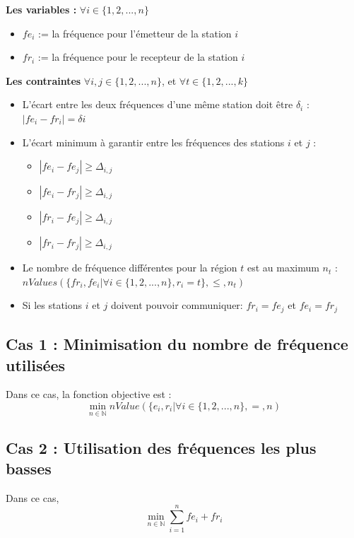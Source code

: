 \documentclass[a4paper, 10pt]{article}
\begin{document}
    \textbf{Les variables : } $\forall i \in \{1,2,...,n \}$
    \begin{itemize}
      \item $fe_{i}$ := la fréquence pour l'émetteur de la station $i$
      \item $fr_{i}$ := la fréquence pour le recepteur de la station $i$
    \end{itemize}

    \textbf{Les contraintes} $\forall i,j \in \{1,2,...,n \}$, et $\forall t \in \{1,2,...,k\}$
    \begin{itemize}
      \item L'écart entre les deux fréquences d'une même station doit être $\delta_{i}$ :
       $| fe_{i} - fr_{i} | = \delta{i}$
      \item L'écart minimum à garantir entre les fréquences des stations $i$ et $j$ :
      \begin{itemize}
        \item $| fe_i - fe_j | \geq \Delta_{i,j}$
        \item $| fe_i - fr_j | \geq \Delta_{i,j}$
        \item $| fr_i - fe_j | \geq \Delta_{i,j}$
        \item $| fr_i - fr_j | \geq \Delta_{i,j}$
      \end{itemize}
      \item Le nombre de fréquence différentes pour la région $t$ est au maximum $n_t$ : $nValues(\{fr_{i}, fe_{i} | \forall i \in \{1,2,...,n \}, r_{i} = t \}, \leq, n_{t})$
      \item Si les stations $i$ et $j$ doivent pouvoir communiquer:
      $fr_i = fe_j$ et $fe_i = fr_j$
    \end{itemize}

    \subsection{Cas 1 : Minimisation du nombre de fréquence utilisées}

      Dans ce cas, la fonction objective est :
      $$ \displaystyle{ \min_{n \in \mathbb{N}}  nValue(\{ e_{i}, r_{i} | \forall i \in \{1,2,...,n \}, =, n) }$$

    \subsection{Cas 2 : Utilisation des fréquences les plus basses}

      Dans ce cas,
      $$ \displaystyle{\min_{n \in \mathbb{N}} \sum_{i=1}^{n} fe_i + fr_i } $$
\end{document}
